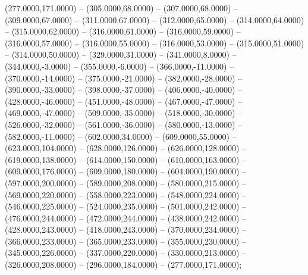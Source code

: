 \begin{scope}[shift={(-276.875,48.125)}]
  \begin{scope}[draw=black,fill=c88bdb2,line join=round,line width=0.208pt]
       (277.0000,171.0000) -- (305.0000,68.0000) -- (307.0000,68.0000)
        -- (309.0000,67.0000) -- (311.0000,67.0000) -- (312.0000,65.0000) --
        (314.0000,64.0000) -- (315.0000,62.0000) -- (316.0000,61.0000) --
        (316.0000,59.0000) -- (316.0000,57.0000) -- (316.0000,55.0000) --
        (316.0000,53.0000) -- (315.0000,51.0000) -- (314.0000,50.0000) --
        (329.0000,31.0000) -- (341.0000,8.0000) -- (344.0000,-3.0000) --
        (355.0000,-6.0000) -- (366.0000,-11.0000) -- (370.0000,-14.0000) --
        (375.0000,-21.0000) -- (382.0000,-28.0000) -- (390.0000,-33.0000) --
        (398.0000,-37.0000) -- (406.0000,-40.0000) -- (428.0000,-46.0000) --
        (451.0000,-48.0000) -- (467.0000,-47.0000) -- (469.0000,-47.0000) --
        (509.0000,-35.0000) -- (518.0000,-30.0000) -- (526.0000,-32.0000) --
        (561.0000,-36.0000) -- (580.0000,-13.0000) -- (582.0000,-11.0000) --
        (602.0000,34.0000) -- (609.0000,55.0000) -- (623.0000,104.0000) --
        (628.0000,126.0000) -- (626.0000,128.0000) -- (619.0000,138.0000) --
        (614.0000,150.0000) -- (610.0000,163.0000) -- (609.0000,176.0000) --
        (609.0000,180.0000) -- (604.0000,190.0000) -- (597.0000,200.0000) --
        (589.0000,208.0000) -- (580.0000,215.0000) -- (569.0000,220.0000) --
        (558.0000,223.0000) -- (548.0000,224.0000) -- (546.0000,225.0000) --
        (524.0000,235.0000) -- (501.0000,242.0000) -- (476.0000,244.0000) --
        (472.0000,244.0000) -- (438.0000,242.0000) -- (428.0000,243.0000) --
        (418.0000,243.0000) -- (370.0000,234.0000) -- (366.0000,233.0000) --
        (365.0000,233.0000) -- (355.0000,230.0000) -- (345.0000,226.0000) --
        (337.0000,220.0000) -- (330.0000,213.0000) -- (326.0000,208.0000) --
        (296.0000,184.0000) -- (277.0000,171.0000);
  \end{scope}
\end{scope}
\begin{scope}[shift={(-276.875,48.125)},draw=cff0000,line width=0.800pt]
\end{scope}

